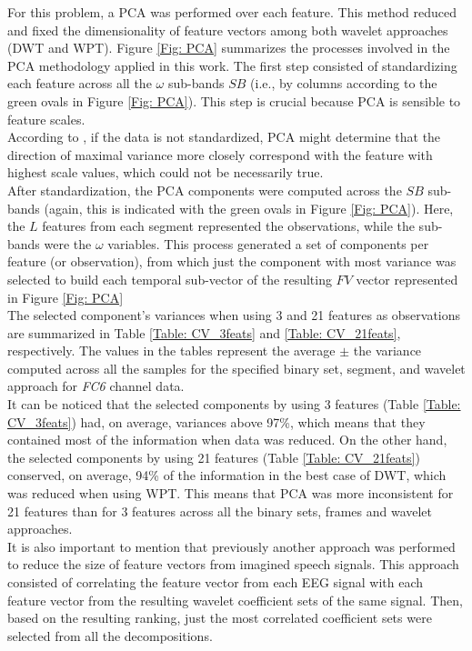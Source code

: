 For this problem, a PCA was performed over each feature. This method reduced and fixed the dimensionality of feature vectors among both wavelet approaches (DWT and WPT). Figure \ref{Fig: PCA} summarizes the processes involved in the PCA methodology applied in this work. The first step consisted of standardizing each feature across all the $ \omega $ sub-bands $ SB $ (i.e., by columns according to the green ovals in Figure \ref{Fig: PCA}). This step is crucial because PCA is sensible to feature scales.\\

According to \cite{pca}, if the data is not standardized, PCA might determine that the direction of maximal variance more closely correspond with the feature with highest scale values, which could not be necessarily true.\\

After standardization, the PCA components were computed across the $ SB $ sub-bands (again, this is indicated with the green ovals in Figure \ref{Fig: PCA}). Here, the $ L $ features from each segment represented the observations, while the sub-bands were the $ \omega $ variables. This process generated a set of components per feature (or observation), from which just the component with most variance was selected to build each temporal sub-vector of the resulting $ FV $ vector represented in Figure \ref{Fig: PCA}\\

The selected component's variances when using 3 and 21 features as observations are summarized in Table \ref{Table: CV_3feats} and \ref{Table: CV_21feats}, respectively. The values in the tables represent the average $ \pm $ the variance computed across all the samples for the specified binary set, segment, and wavelet approach for \textit{FC6} channel data.\\

It can be noticed that the selected components by using 3 features (Table \ref{Table: CV_3feats}) had, on average, variances above 97\%, which means that they contained most of the information when data was reduced. On the other hand, the selected components by using 21 features (Table \ref{Table: CV_21feats}) conserved, on average, 94\% of the information in the best case of DWT, which was reduced when using WPT. This means that PCA was more inconsistent for 21 features than for 3 features across all the binary sets, frames and wavelet approaches.\\

It is also important to mention that previously another approach was performed to reduce the size of feature vectors from imagined speech signals. This approach consisted of correlating the feature vector from each EEG signal with each feature vector from the resulting wavelet coefficient sets of the same signal. Then, based on the resulting ranking, just the most correlated coefficient sets were selected from all the decompositions.\\

